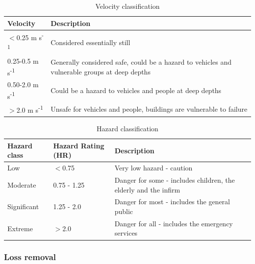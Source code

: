 \documentclass[APA,Times2COL]{WileyNJDv5}
\begin{document}
\setlength\tabcolsep{0pt}
\renewcommand{\arraystretch}{1.5} %
\begin{table}[h!]
\centering
\caption{Velocity classification \citep{envagency2019}}
\begin{tabular}{C{3cm} C{14cm}} 
 \hline
 \textbf{Velocity} & \textbf{Description} \\ [0.5ex] 
 \hline
 $<$0.25 m s\textsuperscript{-1} & Considered essentially still \\
 0.25-0.5 m s\textsuperscript{-1} & Generally considered safe, could be a hazard to vehicles and vulnerable 
groups at deep depths \\
 0.50-2.0 m s\textsuperscript{-1} & Could be a hazard to vehicles and people at deep depths\\
 $>$2.0 m s\textsuperscript{-1} & Unsafe for vehicles and people, buildings are vulnerable to failure\\[1ex] 
 \hline
\end{tabular}
\label{table:velocity_cats}
\end{table}

\setlength\tabcolsep{0pt}
\renewcommand{\arraystretch}{1.5} %
\begin{table}[h!]
\centering
\caption{Hazard classification \citep{envagency2019} }
\begin{tabular}{C{3cm} C{4cm} C{10cm}} 
 \hline
 \textbf{Hazard class} & \textbf{Hazard Rating (HR)} & \textbf{Description} \\ [0.5ex] 
 \hline
 Low & $<$0.75 & Very low hazard - caution \\
 Moderate & 0.75 - 1.25 & Danger for some - includes children, the elderly and the infirm\\
 Significant & 1.25 - 2.0 & Danger for most - includes the general public \\
 Extreme & $>$2.0 & Danger for all - includes the emergency services \\
 \hline
\end{tabular}
\label{table:hazard_cats}
\end{table}
\endgroup

\subsubsection{Loss removal}
\end{document}
